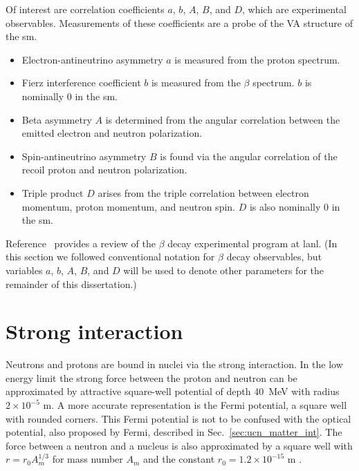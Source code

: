 Of interest are correlation coefficients $a$, $b$, $A$, $B$, and $D$, which are experimental observables. Measurements of these coefficients are a probe of the V\textendash A structure of the \acrshort{sm}. 
%
\begin{itemize}
    \item Electron-antineutrino asymmetry $a$ is measured from the proton spectrum.
    \item Fierz interference coefficient $b$ is measured from the $\beta$ spectrum. $b$ is nominally $0$ in the \acrshort*{sm}.
    \item Beta asymmetry $A$ is determined from the angular correlation between the emitted electron and neutron polarization.
    \item Spin-antineutrino asymmetry $B$ is found via the angular correlation of the recoil proton and neutron polarization.
    \item Triple product $D$ arises from the triple correlation between electron momentum, proton momentum, and neutron spin. $D$ is also nominally $0$ in the \acrshort*{sm}.
\end{itemize}

Reference~\cite{Young2014} provides a review of the $\beta$ decay experimental program at \acrshort{lanl}. (In this section we followed conventional notation for $\beta$ decay observables, but variables $a$, $b$, $A$, $B$, and $D$ will be used to denote other parameters for the remainder of this dissertation.) 



\section{Strong interaction}


Neutrons and protons are bound in nuclei via the strong interaction. In the low energy limit the strong force between the proton and neutron can be approximated by attractive square-well potential of depth \qty{40}{\mega\eV} with radius $2\times10^{-5}\text{ m}$. A more accurate representation is the Fermi potential, a square well with rounded corners. This Fermi potential is not to be confused with the optical potential, also proposed by Fermi, described in Sec.~\ref{sec:ucn_matter_int}. The force between a neutron and a nucleus is also approximated by a square well with $r=r_0A_m^{1/3}$ for mass number $A_m$ and the constant $r_0=1.2\times10^{-15}\text{ m}$ \cite{golubUCN}.

